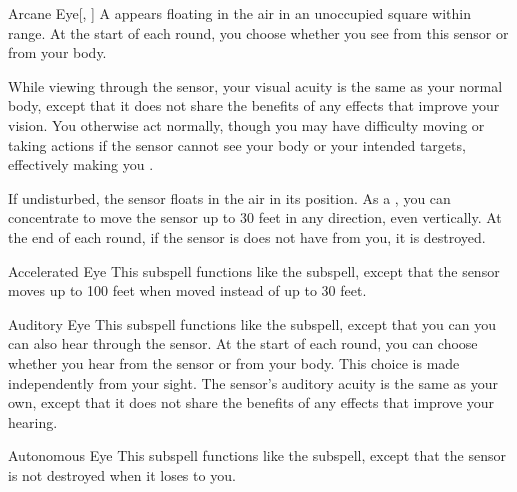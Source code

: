 \begin{ability}[\nth{1}]{Arcane Eye}[, ]
A  appears floating in the air in an unoccupied square within \rngmed range.
At the start of each round, you choose whether you see from this sensor or from your body.

While viewing through the sensor, your visual acuity is the same as your normal body, except that it does not share the benefits of any  effects that improve your vision.
You otherwise act normally, though you may have difficulty moving or taking actions if the sensor cannot see your body or your intended targets, effectively making you \blinded.

If undisturbed, the sensor floats in the air in its position.
As a , you can concentrate to move the sensor up to 30 feet in any direction, even vertically.
At the end of each round, if the sensor is does not have  from you, it is destroyed.
\end{ability}
\vspace{0.25em}


\begin{ability}[\nth{2}]{Accelerated Eye}
This subspell functions like the  subspell, except that the sensor moves up to 100 feet when moved instead of up to 30 feet.
\end{ability}
\vspace{0.25em}


\begin{ability}[\nth{2}]{Auditory Eye}
This subspell functions like the  subspell, except that you can you can also hear through the sensor.
At the start of each round, you can choose whether you hear from the sensor or from your body.
This choice is made independently from your sight.
The sensor's auditory acuity is the same as your own, except that it does not share the benefits of any  effects that improve your hearing.
\end{ability}
\vspace{0.25em}


\begin{ability}[\nth{3}]{Autonomous Eye}
This subspell functions like the  subspell, except that the sensor is not destroyed when it loses  to you.
\end{ability}
\vspace{0.25em}



